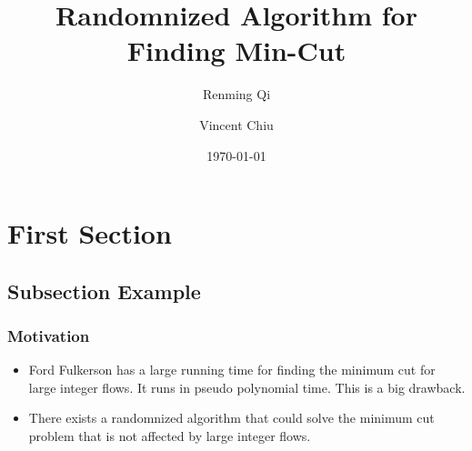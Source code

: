 \documentclass{beamer}
\title[Randomnized Algorithm]{Randomnized Algorithm for Finding Min-Cut } %
\author{Renming Qi \and Vincent Chiu} %
\date{\today} %
\begin{document}
\begin{frame}
\titlepage %
\end{frame}



\section{First Section} %

\subsection{Subsection Example} %




\begin{frame}
\frametitle{Motivation}
\begin{itemize}
	\item Ford Fulkerson has a large running time for finding the minimum cut for large integer flows. It runs in pseudo polynomial time.  This is a big drawback.
	\item There exists a randomnized algorithm that could solve the minimum cut problem that is not affected by large integer flows.
\end{itemize}


\end{frame}
\end{document}
